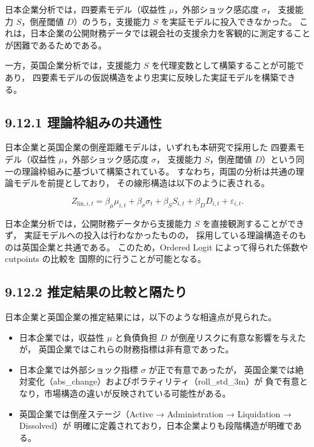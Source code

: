日本企業分析では，四要素モデル（収益性 $\mu$，外部ショック感応度 $\sigma$，
支援能力 $S$，倒産閾値 $D$）のうち，支援能力 $S$ を実証モデルに投入できなかった。
これは，日本企業の公開財務データでは親会社の支援余力を客観的に測定することが困難であるためである。

一方，英国企業分析では，支援能力 $S$ を代理変数として構築することが可能であり，
四要素モデルの仮説構造をより忠実に反映した実証モデルを構築できる。

\subsection*{9.12.1 理論枠組みの共通性}

日本企業と英国企業の倒産距離モデルは，いずれも本研究で採用した
四要素モデル（収益性 $\mu$，外部ショック感応度 $\sigma$，
支援能力 $S$，倒産閾値 $D$）という同一の理論枠組みに基づいて構築されている。
すなわち，両国の分析は共通の理論モデルを前提としており，
その線形構造は以下のように表される。



\[
Z_{\text{lin},i,t}
= \beta_\mu \mu_{i,t}
+ \beta_\sigma \sigma_{t}
+ \beta_S S_{i,t}
+ \beta_D D_{i,t}
+ \varepsilon_{i,t}.
\]



日本企業分析では，公開財務データから支援能力 $S$ を直接観測することができず，
実証モデルへの投入は行わなかったものの，
採用している理論構造そのものは英国企業と共通である。
このため，Ordered Logit によって得られた係数や cutpoints の比較を
国際的に行うことが可能となる。

\subsection*{9.12.2 推定結果の比較と隔たり}

日本企業と英国企業の推定結果には，以下のような相違点が見られた。

\begin{itemize}
    \item 日本企業では，収益性 $\mu$ と負債負担 $D$ が倒産リスクに有意な影響を与えたが，
          英国企業ではこれらの財務指標は非有意であった。
    \item 日本企業では外部ショック指標 $\sigma$ が正で有意であったが，
          英国企業では絶対変化（abs\_change）およびボラティリティ（roll\_std\_3m）が
          負で有意となり，市場構造の違いが反映されている可能性がある。
    \item 英国企業では倒産ステージ（Active → Administration → Liquidation → Dissolved）が
          明確に定義されており，日本企業よりも段階構造が明確である。
\end{itemize}


